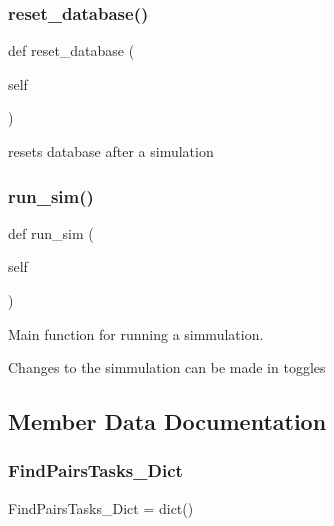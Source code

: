 \subsubsection{\texorpdfstring{reset\_database()}{reset\_database()}}
{\footnotesize\ttfamily def reset\+\_\+database (\begin{DoxyParamCaption}\item[{}]{self }\end{DoxyParamCaption})}



resets database after a simulation 

\mbox{\label{classjoinapp_1_1join__simulations_1_1_join_simulation_aafbc405f49645141a30302a448b056dc}} 
\subsubsection{\texorpdfstring{run\_sim()}{run\_sim()}}
{\footnotesize\ttfamily def run\+\_\+sim (\begin{DoxyParamCaption}\item[{}]{self }\end{DoxyParamCaption})}



Main function for running a simmulation. 

Changes to the simmulation can be made in toggles 

\subsection{Member Data Documentation}
\mbox{\label{classjoinapp_1_1join__simulations_1_1_join_simulation_ad4d8fe10643a96959cbdd58a76ace647}} 
\subsubsection{\texorpdfstring{FindPairsTasks\_Dict}{FindPairsTasks\_Dict}}
{\footnotesize\ttfamily Find\+Pairs\+Tasks\+\_\+\+Dict = dict()\hspace{0.3cm}{\ttfamily [static]}}



